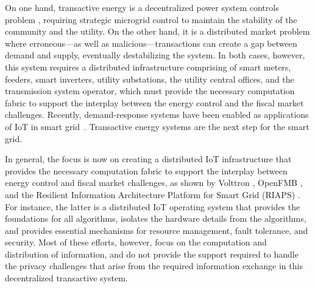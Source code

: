 On one hand, transactive energy is a decentralized power system
controls problem \cite{7452738}, requiring strategic microgrid control
to maintain the stability of the community and the utility. On the
other hand, it is a distributed market problem where erroneous---as
well as malicious---transactions can create a gap between demand and
supply, eventually destabilizing the system. In both cases, however,
this system requires a distributed infrastructure comprising of smart
meters, feeders, smart inverters, utility substations, the utility
central offices, and the transmission system operator, which must
provide the necessary computation fabric to support the interplay
between the energy control and the fiscal market challenges.
Recently, demand-response systems have been enabled as applications of
IoT in smart grid~\cite{Haider2016166}. Transactive energy systems are
the next step for the smart grid.

In general, the focus is now on creating a distributed IoT
infrastructure
that provides the necessary computation fabric to support the
interplay between energy control and fiscal market challenges, as
shown by Volttron \cite{katipamula2016volttron}, OpenFMB
\cite{gunthersmart}, and the Resilient Information Architecture
Platform for Smart Grid (RIAPS)
\cite{eisele2017riaps,Scott2017ICCPS}. For instance, the latter is a
distributed IoT operating system that provides the foundations for all
algorithms, isolates the hardware details from the algorithms, and
provides essential mechanisms for resource management, fault
tolerance, and security. Most of these efforts, however, focus on the
computation and distribution of information, and do not provide the
support required to handle the privacy challenges that arise from the
required information exchange in this decentralized transactive
system.

